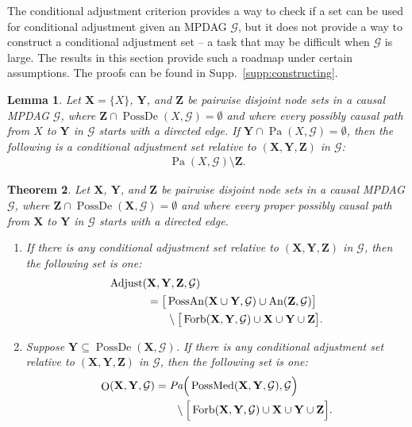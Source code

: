 \documentclass[twoside]{article}
\newtheorem{theorem}{Theorem}
\newtheorem{lemma}[theorem]{Lemma}
\DeclareMathOperator{\An}{An}
\DeclareMathOperator{\Pa}{Pa}
\DeclareMathOperator{\PossDe}{PossDe}
\DeclareMathOperator{\PossAn}{PossAn}
\DeclareMathOperator{\Forb}{Forb}
\newcommand{\fb}[2][X,Y]{\Forb(\mb{#1},#2)}
\DeclareMathOperator{\Adjust}{Adjust}
\DeclareMathOperator{\PossMediators}{PossMed}
\newcommand{\possmediatb}[2][X,Y]{\PossMediators(\mb{#1},#2)}
\DeclareMathOperator{\Opt}{O}
\newcommand{\optb}[2][X,Y]{\Opt(\mb{#1},#2)}
\newcommand{\mb}[1]{\mathbf{#1}}
\newcommand{\g}[1][G]{\mathcal{#1}}
\begin{document}
The conditional adjustment criterion provides a way to check if a set can be used for conditional adjustment given an MPDAG $\g$, but it does not provide a way to construct a conditional adjustment set -- a task that may be difficult when $\g$ is large. The results in this section provide such a roadmap under certain assumptions. The proofs can be found in Supp.\ \ref{supp:constructing}.


\begin{lemma}
\label{lem:parent-set}
    Let $\mb{X} =\{X\}$, $\mb{Y}$, and $\mb{Z}$ be pairwise disjoint node sets in a causal MPDAG $\g$, where $\mb{Z} \cap \PossDe(X, \g) = \emptyset$ and where every possibly causal path from $X$ to $\mb{Y}$ in $\g$ starts with a directed edge. If $\mb{Y} \cap \Pa(X, \g) = \emptyset$, then the following is a conditional adjustment set relative to $(\mb{X,Y,Z})$ in $\g$:
    \begin{align}
        \Pa(X, \g) \setminus \mb{Z}. \label{eq:parent-set}
    \end{align}
\end{lemma}


 
\begin{theorem}
\label{thm:adjust-and-o} 
    Let $\mb{X}$, $\mb{Y}$, and $\mb{Z}$ be pairwise disjoint node sets in a causal MPDAG $\g$, where $\mb{Z} \cap \PossDe(\mb{X}, \g) = \emptyset$ and where every proper possibly causal path from $\mb{X}$ to $\mb{Y}$ in $\g$ starts with a directed edge. 
    \begin{enumerate}[label = (\alph*)]
        \item If there is any conditional adjustment set relative to $(\mb{X,Y,Z})$ in $\g$, then the following set is one:
        \begin{align}
            \Adjust(&\mb{X},\mb{Y},\mb{Z},\g) \label{eq:adjust-mpdag}\\
                &= \big[ \PossAn(\mb{X \cup Y},\g) \cup \An(\mb{Z}, \g) \big]  \nonumber \\
                &  \hspace{.25in} \setminus \big[ \fb{\g} \cup \mb{X} \cup \mb{Y} \cup \mb{Z} \big]. \nonumber
        \end{align}
        
        \item Suppose $\mb{Y} \subseteq \PossDe(\mb{X}, \g)$. If there is any conditional adjustment set relative to $(\mb{X,Y,Z})$ in $\g$, then the following set is one:
        \begin{align}\label{eq:o-set}
            \optb{\g} &= \emph{Pa}\Big(\possmediatb{\g},\g \Big)  \\
            &\hspace{.25in} \setminus \Big[ \fb{\g} \cup \mb{X} \cup \mb{Y} \cup \mb{Z} \Big]. \nonumber
        \end{align}
    \end{enumerate}
\end{theorem}
\end{document}
